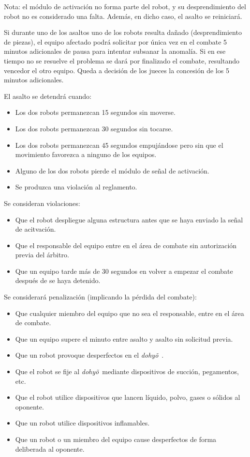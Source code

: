 \documentclass[a4paper,11pt]{article}
\newcommand{\dojo}{\emph{dohy\~{o}}~}
\begin{document}
Nota: el módulo de activación no forma parte del robot, y su desprendimiento del robot no es considerado una falta. Además, en dicho caso, el asalto se reiniciará.

Si durante uno de los asaltos uno de los robots resulta dañado (desprendimiento de piezas), el equipo afectado podrá solicitar por única vez en el combate 5 minutos adicionales de pausa para intentar subsanar la anomalía. Si en ese tiempo no se resuelve el problema se dará por finalizado el combate, resultando vencedor el otro equipo. Queda a decisión de los jueces la concesión de los 5 minutos adicionales.

El asalto se detendrá cuando:
\begin{itemize}
\item Los dos robots permanezcan 15 segundos sin moverse.
\item Los dos robots permanezcan 30 segundos sin tocarse.
\item Los dos robots permanezcan 45 segundos empujándose pero sin que el movimiento favorezca a ninguno de los equipos.
\item Alguno de los dos robots pierde el módulo de señal de activación.
\item Se produzca una violación al reglamento.
\end{itemize}

Se consideran violaciones:
\begin{itemize}
\item Que el robot despliegue alguna estructura antes que se haya enviado la señal de acitvación.
\item Que el responsable del equipo entre en el área de combate sin autorización previa del árbitro.
\item Que un equipo tarde más de 30 segundos en volver a empezar el combate después de se haya detenido.
\end{itemize}

Se considerará penalización (implicando la pérdida del combate):
\begin{itemize}
\item Que cualquier miembro del equipo que no sea el responsable, entre en el área de combate.
\item Que un equipo supere el minuto entre asalto y asalto sin solicitud previa.
\item Que un robot provoque desperfectos en el \dojo.
\item Que el robot se fije al \dojo mediante dispositivos de succión, pegamentos, etc.
\item Que el robot utilice dispositivos que lancen líquido, polvo, gases o sólidos al oponente.
\item Que un robot utilice dispositivos inflamables.
\item Que un robot o un miembro del equipo cause desperfectos de forma deliberada al oponente.
\end{itemize}
\end{document}
